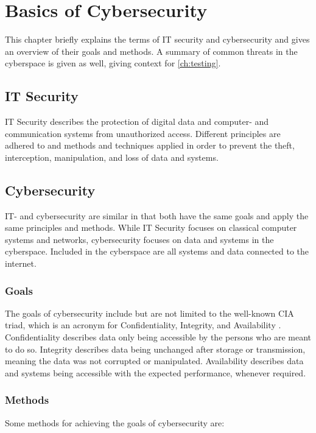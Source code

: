 \chapter{Basics of Cybersecurity}\label{ch:basics_cybersec}
This chapter briefly explains the terms of IT security and cybersecurity and gives an overview of their goals and methods.
A summary of common threats in the cyberspace is given as well, giving context for \cref{ch:testing}.

\section{IT Security}
IT Security describes the protection of digital data and computer- and communication systems from unauthorized access.
Different principles are adhered to and methods and techniques applied in order to prevent the theft, interception, manipulation, and loss of data and systems. \cite{IT_Basiswissen}

\section{Cybersecurity}
IT- and cybersecurity are similar in that both have the same goals and apply the same principles and methods.
While IT Security focuses on classical computer systems and networks, cybersecurity focuses on data and systems in the cyberspace.
Included in the cyberspace are all systems and data connected to the internet.

\subsection{Goals}
The goals of cybersecurity include but are not limited to the well-known CIA triad, which is an acronym for Confidentiality, Integrity, and Availability \cite{Oriyano_2017}.
Confidentiality describes data only being accessible by the persons who are meant to do so.
Integrity describes data being unchanged after storage or transmission, meaning the data was not corrupted or manipulated.
Availability describes data and systems being accessible with the expected performance, whenever required. 

\subsection{Methods}\label{ssec:cs_methods}
Some methods for achieving the goals of cybersecurity are:

